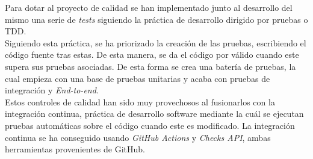 Para dotar al proyecto de calidad se han implementado junto al desarrollo del mismo una serie de \textit{tests} siguiendo la práctica de desarrollo dirigido por pruebas o TDD.\\

Siguiendo esta práctica, se ha priorizado la creación de las pruebas, escribiendo el código fuente tras estas. De esta manera, se da el código por válido cuando este supera sus pruebas asociadas.
De esta forma se crea una batería de pruebas, la cual empieza con una base de pruebas unitarias y acaba con pruebas de integración y \textit{End-to-end}.\\

Estos controles de calidad han sido muy provechosos al fusionarlos con la integración continua, práctica de desarrollo software mediante la cuál se ejecutan pruebas automáticas sobre el código cuando este es modificado.
La integración continua se ha conseguido usando \textit{GitHub Actions} y \textit{Checks API}, ambas herramientas provenientes de GitHub.